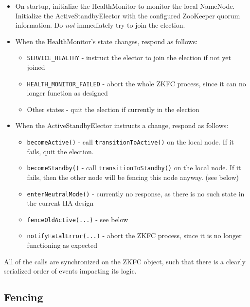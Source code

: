 \documentclass{article}
\begin{document}
\begin{itemize}
\item On startup, initialize the HealthMonitor to monitor the local NameNode. Initialize the ActiveStandbyElector with the configured ZooKeeper quorum information. Do {\em not} immediately try to join the election.
\item When the HealthMonitor's state changes, respond as follows:
  \begin{itemize}
  \item {\tt SERVICE\_HEALTHY} - instruct the elector to join the election if not yet joined
  \item {\tt HEALTH\_MONITOR\_FAILED} - abort the whole ZKFC process, since it can no longer function as designed
  \item Other states - quit the election if currently in the election
  \end{itemize}
\item When the ActiveStandbyElector instructs a change, respond as follows:
  \begin{itemize}
  \item {\tt becomeActive()} - call {\tt transitionToActive()} on the local node. If it fails, quit the election.
  \item {\tt becomeStandby()} - call {\tt transitionToStandby()} on the local node. If it fails, then the other node will be fencing this node anyway. (see below)
  \item {\tt enterNeutralMode()} - currently no response, as there is no such state in the current HA design
  \item {\tt fenceOldActive(...)} - see below
  \item {\tt notifyFatalError(...)} - abort the ZKFC process, since it is no longer functioning as expected
  \end{itemize}
\end{itemize}

All of the calls are synchronized on the ZKFC object, such that there is a clearly serialized order of events impacting its logic.

\subsection{Fencing}
\end{document}
